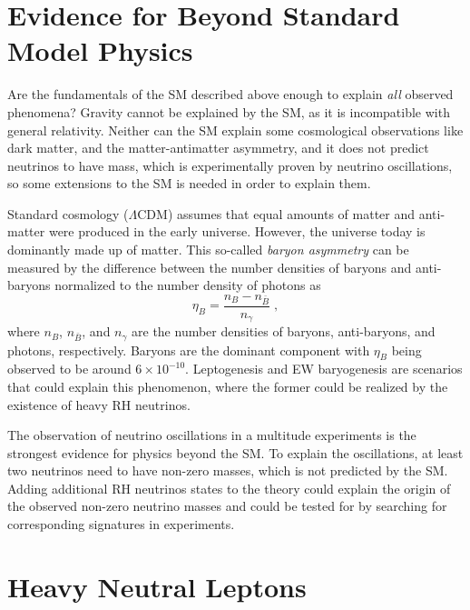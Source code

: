 

\section{Evidence for Beyond Standard Model Physics}


Are the fundamentals of the SM described above enough to explain \textit{all} observed phenomena? Gravity cannot be explained by the SM, as it is incompatible with general relativity. Neither can the SM explain some cosmological observations like dark matter, and the matter-antimatter asymmetry, and it does not predict neutrinos to have mass, which is experimentally proven by neutrino oscillations, so some extensions to the SM is needed in order to explain them.

Standard cosmology ($\Lambda$CDM) assumes that equal amounts of matter and anti-matter were produced in the early universe. However, the universe today is dominantly made up of matter. This so-called \textit{baryon asymmetry} can be measured by the difference between the number densities of baryons and anti-baryons normalized to the number density of photons as
\begin{equation}
    \eta_B = \frac{n_B - n_{\bar{B}}}{n_\gamma}
    \;,
\end{equation}
where $n_B$, $n_{\bar{B}}$, and $n_\gamma$ are the number densities of baryons, anti-baryons, and photons, respectively. Baryons are the dominant component with  $\eta_B$ being observed to be around $6 \times 10^{-10}$. Leptogenesis and EW baryogenesis are scenarios that could explain this phenomenon, where the former could be realized by the existence of heavy RH neutrinos.

The observation of neutrino oscillations in a multitude experiments  is the strongest evidence for physics beyond the SM. To explain the oscillations, at least two neutrinos need to have non-zero masses, which is not predicted by the SM. Adding additional RH neutrinos states to the theory could explain the origin of the observed non-zero neutrino masses and could be tested for by searching for corresponding signatures in experiments.


\section{Heavy Neutral Leptons} 

